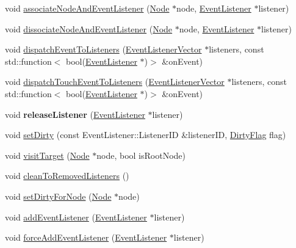 \begin{DoxyCompactItemize}
\item 
void \hyperlink{classEventDispatcher_ae82e15825f3fe6d5d2a32aab9214ddc0}{associate\+Node\+And\+Event\+Listener} (\hyperlink{classNode}{Node} $\ast$node, \hyperlink{classEventListener}{Event\+Listener} $\ast$listener)
\item 
void \hyperlink{classEventDispatcher_a43a5aaec61fcbec266dc62a50de7cbad}{dissociate\+Node\+And\+Event\+Listener} (\hyperlink{classNode}{Node} $\ast$node, \hyperlink{classEventListener}{Event\+Listener} $\ast$listener)
\item 
void \hyperlink{classEventDispatcher_a5809ae1e58312586afdff6d11b821957}{dispatch\+Event\+To\+Listeners} (\hyperlink{classEventDispatcher_1_1EventListenerVector}{Event\+Listener\+Vector} $\ast$listeners, const std\+::function$<$ bool(\hyperlink{classEventListener}{Event\+Listener} $\ast$)$>$ \&on\+Event)
\item 
void \hyperlink{classEventDispatcher_ad49739c7342d1ccf133914414559ecdd}{dispatch\+Touch\+Event\+To\+Listeners} (\hyperlink{classEventDispatcher_1_1EventListenerVector}{Event\+Listener\+Vector} $\ast$listeners, const std\+::function$<$ bool(\hyperlink{classEventListener}{Event\+Listener} $\ast$)$>$ \&on\+Event)
\item 
\mbox{\label{classEventDispatcher_a7786d95286ac416c06c4783623feda09}} 
void {\bfseries release\+Listener} (\hyperlink{classEventListener}{Event\+Listener} $\ast$listener)
\item 
void \hyperlink{classEventDispatcher_aacdc31196bd0b1881d4e2b807134882f}{set\+Dirty} (const Event\+Listener\+::\+Listener\+ID \&listener\+ID, \hyperlink{classEventDispatcher_a05d949544dae4e41a1ba912ab962db33}{Dirty\+Flag} flag)
\item 
void \hyperlink{classEventDispatcher_a3ff088a3e3479d3ffd661c5918bff912}{visit\+Target} (\hyperlink{classNode}{Node} $\ast$node, bool is\+Root\+Node)
\item 
void \hyperlink{classEventDispatcher_ac4610bd51dadf12ab82b1793e26340c6}{clean\+To\+Removed\+Listeners} ()
\item 
void \hyperlink{classEventDispatcher_ad6b4737e5007cd150b894a49d8f6ea28}{set\+Dirty\+For\+Node} (\hyperlink{classNode}{Node} $\ast$node)
\item 
void \hyperlink{classEventDispatcher_aacb9cc74f76d66952e749f2cc1519444}{add\+Event\+Listener} (\hyperlink{classEventListener}{Event\+Listener} $\ast$listener)
\item 
void \hyperlink{classEventDispatcher_aaf736dd2a383a114e59be39e967fb0f3}{force\+Add\+Event\+Listener} (\hyperlink{classEventListener}{Event\+Listener} $\ast$listener)

\end{DoxyCompactItemize}

